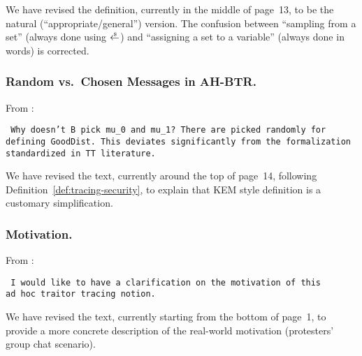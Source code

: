 We have revised the definition,
currently in the middle of page~13,
to be the natural (``appropriate/general'') version.
The confusion between
``sampling from a set'' (always done using $\draws$) and
``assigning a set to a variable'' (always done in words) is corrected.

\subsubsection{Random vs.\ Chosen Messages in AH-BTR.}
From :

\texttt{
Why doesn't B pick mu\_0 and mu\_1? There are picked randomly for \\
defining GoodDist. This deviates significantly from the formalization \\
standardized in TT literature.
}

We have revised the text, currently around the top of page~14,
following Definition~\ref{def:tracing-security},
to explain that KEM style definition is a customary simplification.

\subsubsection{Motivation.}
From :

\texttt{
I would like to have a clarification on the motivation of this \\
ad hoc traitor tracing notion.
}

We have revised the text, currently starting from the bottom of page~1,
to provide a more concrete description of the real-world motivation
(protesters' group chat scenario).



 
 
